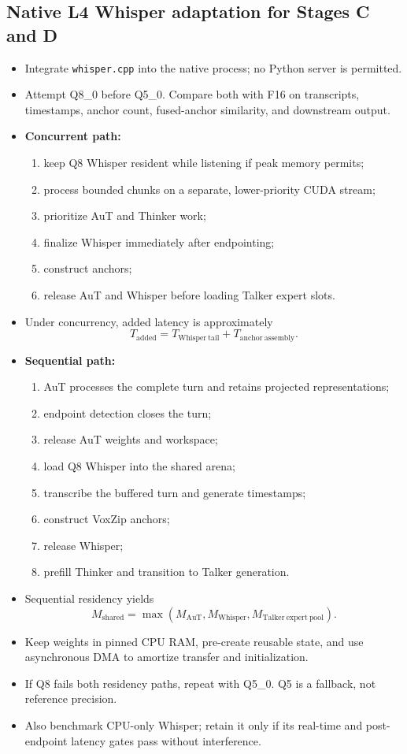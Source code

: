 \documentclass[10pt,letterpaper]{article}
\newcommand{\code}[1]{\texttt{#1}}
\begin{document}
\subsection{Native L4 Whisper adaptation for Stages C and D}
\begin{itemize}
    \item Integrate \code{whisper.cpp} into the native process; no Python server is permitted.
    \item Attempt Q8\_0 before Q5\_0. Compare both with F16 on transcripts, timestamps, anchor count, fused-anchor similarity, and downstream output.
    \item \textbf{Concurrent path:}
    \begin{enumerate}
        \item keep Q8 Whisper resident while listening if peak memory permits;
        \item process bounded chunks on a separate, lower-priority CUDA stream;
        \item prioritize AuT and Thinker work;
        \item finalize Whisper immediately after endpointing;
        \item construct anchors;
        \item release AuT and Whisper before loading Talker expert slots.
    \end{enumerate}
    \item Under concurrency, added latency is approximately
    \[
    T_{\mathrm{added}}=T_{\mathrm{Whisper\ tail}}+T_{\mathrm{anchor\ assembly}}.
    \]
    \item \textbf{Sequential path:}
    \begin{enumerate}
        \item AuT processes the complete turn and retains projected representations;
        \item endpoint detection closes the turn;
        \item release AuT weights and workspace;
        \item load Q8 Whisper into the shared arena;
        \item transcribe the buffered turn and generate timestamps;
        \item construct VoxZip anchors;
        \item release Whisper;
        \item prefill Thinker and transition to Talker generation.
    \end{enumerate}
    \item Sequential residency yields
    \[
    M_{\mathrm{shared}}=\max\left(M_{\mathrm{AuT}},M_{\mathrm{Whisper}},M_{\mathrm{Talker\ expert\ pool}}\right).
    \]
    \item Keep weights in pinned CPU RAM, pre-create reusable state, and use asynchronous DMA to amortize transfer and initialization.
    \item If Q8 fails both residency paths, repeat with Q5\_0. Q5 is a fallback, not reference precision.
    \item Also benchmark CPU-only Whisper; retain it only if its real-time and post-endpoint latency gates pass without interference.
\end{itemize}
\end{document}
